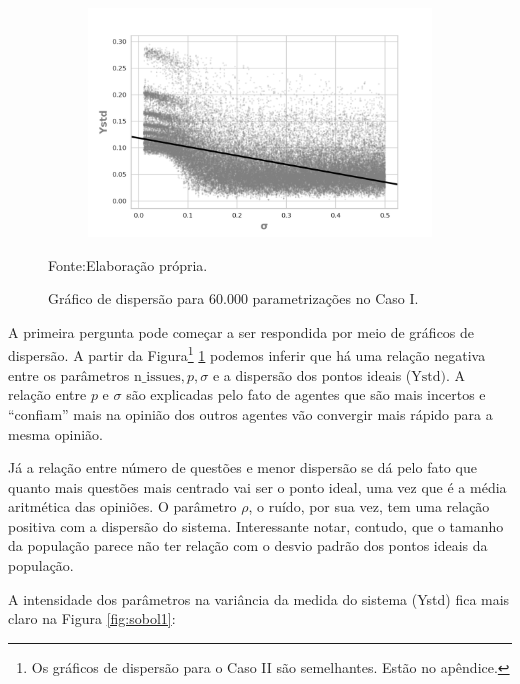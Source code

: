 \begin{figure}[h]
                \begin{subfigure}[b]{0.49\textwidth}
            \includegraphics[width=\textwidth]{ims/mutoregressions/regressionmutatingosigma.png}
    \end{subfigure}
    \caption{Gráfico de dispersão para 60.000 parametrizações no Caso I.}
    \label{fig:scatter1}
    Fonte:Elaboração própria.
\end{figure}

A primeira pergunta pode começar a ser respondida por meio de gráficos de
dispersão. A partir da Figura\footnote{Os gráficos de dispersão para o Caso II
  são semelhantes. Estão no apêndice.} \ref{fig:scatter1} podemos inferir que há
uma relação negativa entre os parâmetros \(\text{n\_issues}, p, \sigma \) e a
dispersão dos pontos ideais (\( \text{Ystd}) \). A relação entre \(p\) e \(\sigma\)
são explicadas pelo fato de agentes que são mais incertos e ``confiam'' mais na
opinião dos outros agentes vão convergir mais rápido para a mesma opinião.


Já a relação entre número de questões e menor dispersão se dá pelo fato que
quanto mais questões mais centrado vai ser o ponto ideal, uma vez que é a média
aritmética das opiniões. O parâmetro \(\rho\), o ruído, por sua vez, tem uma
relação positiva com a dispersão do sistema. Interessante notar, contudo, que o
tamanho da população parece não ter relação com o desvio padrão dos pontos
ideais da população.

A intensidade dos parâmetros na variância da medida do sistema (Ystd) fica mais
claro na Figura \ref{fig:sobol1}:

